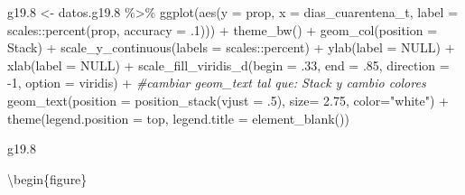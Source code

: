 \documentclass[
  12pt,
]{book}
\newenvironment{Shaded}{\begin{snugshade}}{\end{snugshade}}
\newcommand{\AttributeTok}[1]{\textcolor[rgb]{0.77,0.63,0.00}{#1}}
\newcommand{\CommentTok}[1]{\textcolor[rgb]{0.56,0.35,0.01}{\textit{#1}}}
\newcommand{\ConstantTok}[1]{\textcolor[rgb]{0.00,0.00,0.00}{#1}}
\newcommand{\DecValTok}[1]{\textcolor[rgb]{0.00,0.00,0.81}{#1}}
\newcommand{\FloatTok}[1]{\textcolor[rgb]{0.00,0.00,0.81}{#1}}
\newcommand{\FunctionTok}[1]{\textcolor[rgb]{0.00,0.00,0.00}{#1}}
\newcommand{\NormalTok}[1]{#1}
\newcommand{\OtherTok}[1]{\textcolor[rgb]{0.56,0.35,0.01}{#1}}
\newcommand{\SpecialCharTok}[1]{\textcolor[rgb]{0.00,0.00,0.00}{#1}}
\newcommand{\StringTok}[1]{\textcolor[rgb]{0.31,0.60,0.02}{#1}}
\begin{document}
\begin{Shaded}
\begin{Highlighting}[]
\NormalTok{g19}\FloatTok{.8} \OtherTok{\textless{}{-}}\NormalTok{ datos.g19}\FloatTok{.8} \SpecialCharTok{\%\textgreater{}\%} 
  \FunctionTok{ggplot}\NormalTok{(}\FunctionTok{aes}\NormalTok{(}\AttributeTok{y =}\NormalTok{ prop, }\AttributeTok{x =}\NormalTok{ dias\_cuarentena\_t, }
             \AttributeTok{label =}\NormalTok{ scales}\SpecialCharTok{::}\FunctionTok{percent}\NormalTok{(prop, }\AttributeTok{accuracy =}\NormalTok{ .}\DecValTok{1}\NormalTok{))) }\SpecialCharTok{+} 
  \FunctionTok{theme\_bw}\NormalTok{() }\SpecialCharTok{+} 
  \FunctionTok{geom\_col}\NormalTok{(}\AttributeTok{position =} \StringTok{\textquotesingle{}Stack\textquotesingle{}}\NormalTok{) }\SpecialCharTok{+}
  \FunctionTok{scale\_y\_continuous}\NormalTok{(}\AttributeTok{labels =}\NormalTok{ scales}\SpecialCharTok{::}\NormalTok{percent) }\SpecialCharTok{+}
  \FunctionTok{ylab}\NormalTok{(}\AttributeTok{label =} \ConstantTok{NULL}\NormalTok{) }\SpecialCharTok{+}
  \FunctionTok{xlab}\NormalTok{(}\AttributeTok{label =} \ConstantTok{NULL}\NormalTok{) }\SpecialCharTok{+}
  \FunctionTok{scale\_fill\_viridis\_d}\NormalTok{(}\AttributeTok{begin =}\NormalTok{ .}\DecValTok{33}\NormalTok{, }\AttributeTok{end =}\NormalTok{ .}\DecValTok{85}\NormalTok{, }\AttributeTok{direction =} \SpecialCharTok{{-}}\DecValTok{1}\NormalTok{, }\AttributeTok{option =} \StringTok{\textquotesingle{}viridis\textquotesingle{}}\NormalTok{) }\SpecialCharTok{+}
  \CommentTok{\#cambiar geom\_text tal que: Stack y cambio colores}
  \FunctionTok{geom\_text}\NormalTok{(}\AttributeTok{position =} \FunctionTok{position\_stack}\NormalTok{(}\AttributeTok{vjust =}\NormalTok{ .}\DecValTok{5}\NormalTok{),}
            \AttributeTok{size=} \FloatTok{2.75}\NormalTok{, }\AttributeTok{color=}\StringTok{"white"}\NormalTok{) }\SpecialCharTok{+} 
  \FunctionTok{theme}\NormalTok{(}\AttributeTok{legend.position =} \StringTok{\textquotesingle{}top\textquotesingle{}}\NormalTok{,}
        \AttributeTok{legend.title =} \FunctionTok{element\_blank}\NormalTok{()) }

\NormalTok{g19}\FloatTok{.8}
\end{Highlighting}
\end{Shaded}

\textbackslash begin\{figure\}
\end{document}

